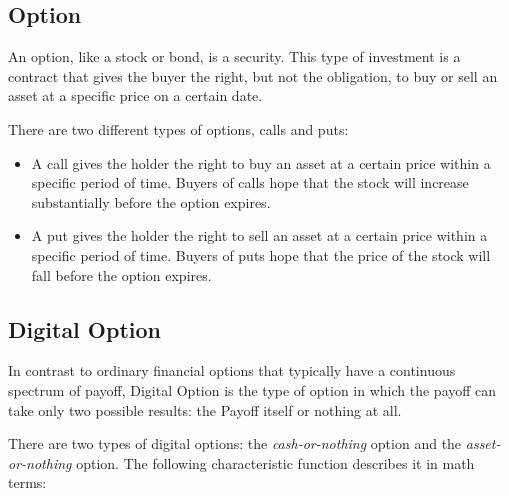 \documentclass[]{elsarticle}
\theoremstyle{definition}
\theoremstyle{remark}
\begin{document}
\subsection{Option}

An option, like a stock or bond, is a security. This type of investment is a contract that gives the buyer the right, but not the obligation, to buy or sell an asset at a specific price on a certain date.

There are two different types of options, calls and puts:
\begin{itemize}
\item A call gives the holder the right to buy an asset at a certain price 
within a specific period of time. Buyers of calls hope that the stock 
will increase substantially before the option expires.
\item A put gives the holder the right to sell an asset at a certain price 
within a specific period of time. Buyers of puts hope that the price of 
the stock will fall before the option expires.
\end{itemize}

\subsection{Digital Option}

In contrast to ordinary financial options that typically have a continuous spectrum of payoff, Digital Option is the type of option in which the payoff can take only two possible results: the Payoff itself
or nothing at all.

There are two types of digital options: the \textit{cash-or-nothing} option and the \textit{asset-or-nothing} option. The following characteristic
function describes it in math terms:
\end{document}
